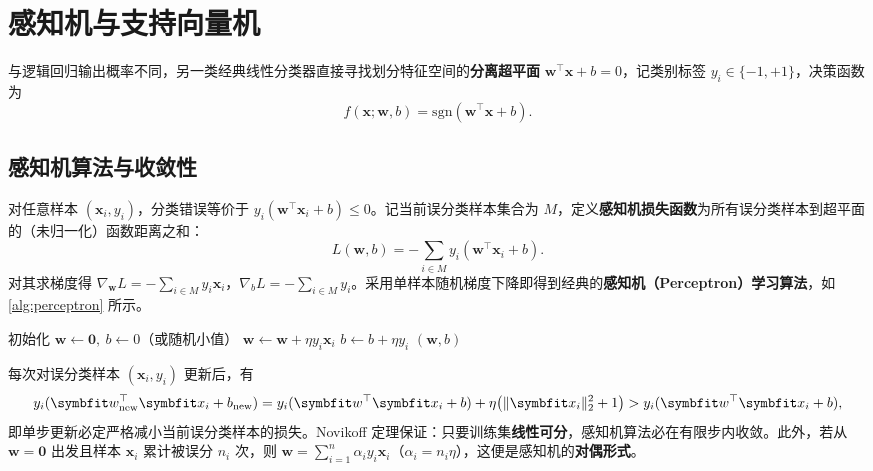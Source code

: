 \section{感知机与支持向量机}\label{sec:perceptron-svm}

与逻辑回归输出概率不同，另一类经典线性分类器直接寻找划分特征空间的\textbf{分离超平面} $\bm{w}^\top\bm{x} + b = 0$，记类别标签 $y_i\in\{-1, +1\}$，决策函数为
\[
  f(\bm{x}; \bm{w}, b) = \mathrm{sgn}(\bm{w}^\top\bm{x} + b).
\]

\subsection{感知机算法与收敛性}

对任意样本 $(\bm{x}_i, y_i)$，分类错误等价于 $y_i(\bm{w}^\top\bm{x}_i + b) \le 0$。记当前误分类样本集合为 $M$，定义\textbf{感知机损失函数}为所有误分类样本到超平面的（未归一化）函数距离之和：
\begin{equation}\label{eq:perceptron-loss}
  L(\bm{w}, b) = -\sum_{i\in M} y_i(\bm{w}^\top\bm{x}_i + b).
\end{equation}
对其求梯度得 $\nabla_{\bm{w}}L = -\sum_{i\in M} y_i\bm{x}_i$，$\nabla_b L = -\sum_{i\in M} y_i$。采用单样本随机梯度下降即得到经典的\textbf{感知机（Perceptron）学习算法}，如 \cref{alg:perceptron} 所示。

\begin{algorithm}\label{alg:perceptron}
\begin{algsteps}
  \State 初始化 $\bm{w}\gets\bm{0},\ b\gets 0$（或随机小值）
  \Repeat
        \State $\bm{w} \gets \bm{w} + \eta y_i\bm{x}_i$
        \State $b \gets b + \eta y_i$
      \EndIf
    \EndFor
  \State \Return $(\bm{w}, b)$
\end{algsteps}
\end{algorithm}

每次对误分类样本 $(\bm{x}_i, y_i)$ 更新后，有
\[
  y_i(\bm{w}_{\text{new}}^\top\bm{x}_i + b_{\text{new}})
  = y_i(\bm{w}^\top\bm{x}_i + b) + \eta\bigl(\norm{\bm{x}_i}_2^2 + 1\bigr)
  > y_i(\bm{w}^\top\bm{x}_i + b),
\]
即单步更新必定严格减小当前误分类样本的损失。Novikoff 定理保证：只要训练集\textbf{线性可分}，感知机算法必在有限步内收敛。此外，若从 $\bm{w}=\bm{0}$ 出发且样本 $\bm{x}_i$ 累计被误分 $n_i$ 次，则 $\bm{w} = \sum_{i=1}^{n} \alpha_i y_i\bm{x}_i$（$\alpha_i = n_i\eta$），这便是感知机的\textbf{对偶形式}。

